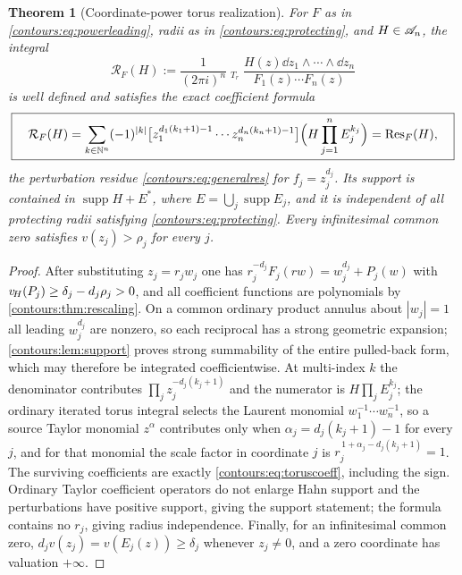 \documentclass[11pt,letterpaper]{article}
\newtheorem{theorem}{Theorem}[section]
\theoremstyle{definition}
\theoremstyle{remark}
\newcommand{\N}{\mathbb N}\newcommand{\Z}{\mathbb Z}\newcommand{\DD}{\mathbb D}
\newcommand{\supp}{\operatorname{supp}}\newcommand{\Res}{\operatorname{Res}}
\newcommand{\HInt}{\mathop{\int^{\!H}}\nolimits}
\numberwithin{equation}{section}
\begin{document}
\begin{theorem}[Coordinate-power torus realization]\label{contours:thm:microtorus}
For $F$ as in \eqref{contours:eq:powerleading}, radii as in
\eqref{contours:eq:protecting}, and $H\in\mathscr A_n$, the integral
\begin{equation}\label{contours:eq:microtorus}
  \mathcal R_F(H):=\frac1{(2\pi i)^n}\HInt_{T_r}
  \frac{H(z)\dd z_1\wedge\cdots\wedge \dd z_n}{F_1(z)\cdots F_n(z)}
\end{equation}
is well defined and satisfies the exact coefficient formula
\begin{equation}\label{contours:eq:toruscoeff}
 \boxed{\quad
 \mathcal R_F(H)=\sum_{k\in\N^n}(-1)^{|k|}
 \bigl[z_1^{d_1(k_1+1)-1}\cdots z_n^{d_n(k_n+1)-1}\bigr]
 \Bigl(H\prod_{j=1}^nE_j^{k_j}\Bigr)
 =\Res_F(H),
 \quad}
\end{equation}
the perturbation residue \eqref{contours:eq:generalres} for $f_j=z_j^{d_j}$. Its
support is contained in $\supp H+E^*$, where $E=\bigcup_j\supp E_j$, and it is
independent of all protecting radii satisfying
\eqref{contours:eq:protecting}. Every infinitesimal common zero satisfies
$v(z_j)>\rho_j$ for every $j$.
\end{theorem}
\begin{proof}
After substituting $z_j=r_jw_j$ one has
$r_j^{-d_j}F_j(rw)=w_j^{d_j}+P_j(w)$ with $v_{\!H}(P_j)\ge\delta_j-d_j\rho_j>0$, and all
coefficient functions are polynomials by \cref{contours:thm:rescaling}. On a common
ordinary product annulus about $|w_j|=1$ all leading $w_j^{d_j}$ are nonzero, so
each reciprocal has a strong geometric expansion; \cref{contours:lem:support} proves
strong summability of the entire pulled-back form, which may therefore be integrated
coefficientwise. At multi-index $k$ the denominator contributes
$\prod_jz_j^{-d_j(k_j+1)}$ and the numerator is $H\prod_jE_j^{k_j}$; the ordinary
iterated torus integral selects the Laurent monomial $w_1^{-1}\cdots w_n^{-1}$, so a
source Taylor monomial $z^\alpha$ contributes only when
$\alpha_j=d_j(k_j+1)-1$ for every $j$, and for that monomial the scale factor in
coordinate $j$ is $r_j^{\,1+\alpha_j-d_j(k_j+1)}=1$. The surviving coefficients are
exactly \eqref{contours:eq:toruscoeff}, including the sign. Ordinary Taylor
coefficient operators do not enlarge Hahn support and the perturbations have
positive support, giving the support statement; the formula contains no $r_j$,
giving radius independence. Finally, for an infinitesimal common zero,
$d_jv(z_j)=v(E_j(z))\ge\delta_j$ whenever $z_j\ne0$, and a zero coordinate has
valuation $+\infty$.
\end{proof}
\end{document}
